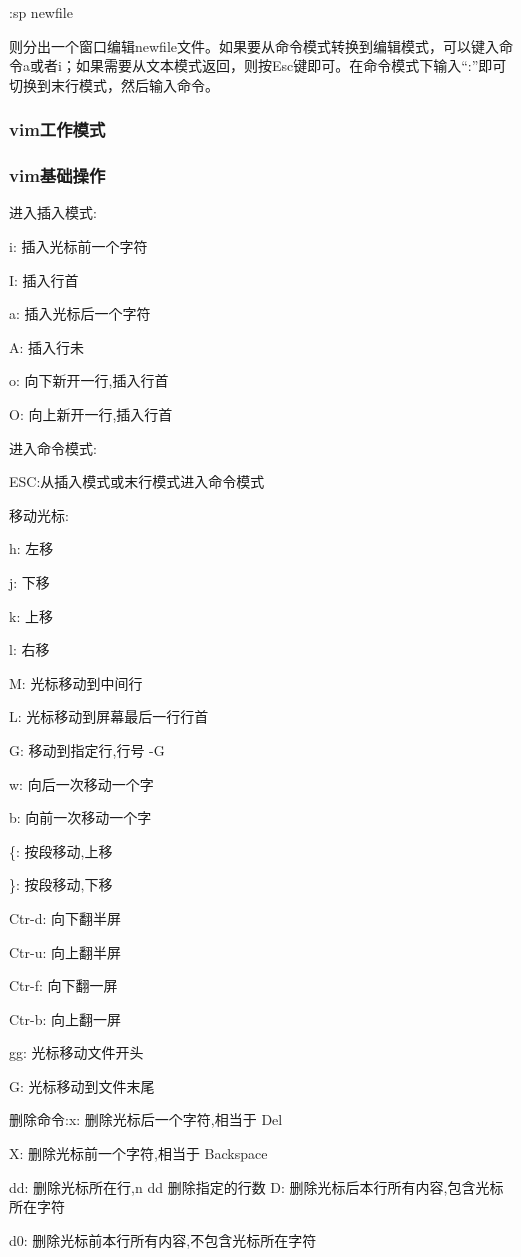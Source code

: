 \documentclass[11pt]{article}
\begin{document}
:sp newfile

则分出一个窗口编辑newfile文件。如果要从命令模式转换到编辑模式，可以键入命令a或者i；如果需要从文本模式返回，则按Esc键即可。在命令模式下输入“:”即可切换到末行模式，然后输入命令。 
\subsubsection{vim工作模式}
\label{sec-1-2-2}
\subsubsection{vim基础操作}
\label{sec-1-2-3}
进入插入模式:

i: 插入光标前一个字符 

I: 插入行首 

a: 插入光标后一个字符 

A: 插入行未 

o: 向下新开一行,插入行首 

O: 向上新开一行,插入行首

进入命令模式:

ESC:从插入模式或末行模式进入命令模式

移动光标:

h: 左移 

j: 下移 

k: 上移 

l: 右移

M: 光标移动到中间行 

L: 光标移动到屏幕最后一行行首 

G: 移动到指定行,行号 -G

w: 向后一次移动一个字 

b: 向前一次移动一个字

\{: 按段移动,上移 

\}: 按段移动,下移

Ctr-d: 向下翻半屏 

Ctr-u: 向上翻半屏

Ctr-f: 向下翻一屏 

Ctr-b: 向上翻一屏

gg: 光标移动文件开头 

G: 光标移动到文件末尾

删除命令:x: 删除光标后一个字符,相当于 Del 

X: 删除光标前一个字符,相当于 Backspace

dd: 删除光标所在行,n dd 删除指定的行数 D: 删除光标后本行所有内容,包含光标所在字符 

d0: 删除光标前本行所有内容,不包含光标所在字符
\end{document}
